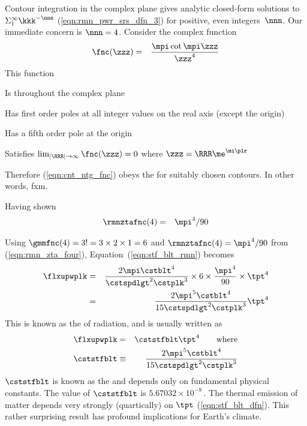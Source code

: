 \documentclass[12pt]{article}
\begin{document}
Contour integration in the complex plane gives analytic closed-form
solutions to $\Sigma_{1}^{\infty} \kkk^{-\nnn}$
(\ref{eqn:rmn_pwr_srs_dfn_3}) for positive, even integers~$\nnn$.
Our immediate concern is $\nnn = 4$.
Consider the complex function \cite[][p.~97]{CCP83}
\begin{eqnarray}
\fnc(\zzz) & = & \frac{\mpi\cot\mpi\zzz}{\zzz^{4}}
\label{eqn:cnt_ntg_fnc}
\end{eqnarray}
This function 
\begin{enumerate*}
\item Is  throughout the complex plane
\item Has first order poles at all integer values on the real axis
  (except the origin)
\item Has a fifth order pole at the origin
\item Satisfies $\lim_{|\RRR| \to \infty} \fnc(\zzz) = 0$
  where $\zzz = \RRR\me^{\mi\plr}$
\end{enumerate*}
Therefore (\ref{eqn:cnt_ntg_fnc}) obeys the 
for suitably chosen contours.
In other words, fxm.

Having shown 
\begin{eqnarray}
\rmnztafnc(4) & = & \mpi^{4}/90
\label{eqn:rmn_zta_four}
\end{eqnarray}

Using $\gmmfnc(4) = 3! = 3 \times 2 \times 1 = 6$
and $\rmnztafnc(4) = \mpi^{4}/90$ from (\ref{eqn:rmn_zta_four}),
Equation~(\ref{eqn:stf_blt_rmn}) becomes
\begin{eqnarray}
\flxupwplk 
& = & \frac{2 \mpi \cstblt^{4}}{\cstspdlgt^{2} \cstplk^{3}} 
\times 6 \times \frac{\mpi^{4}}{90} \times \tpt^{4}
\nonumber \\
& = & \frac{2 \mpi^{5} \cstblt^{4}}{15 \cstspdlgt^{2} \cstplk^{3}} \tpt^{4}
\nonumber
\label{eqn:stf_blt_3}
\end{eqnarray}
This is known as the  of radiation,
and is usually written as 
\begin{eqnarray}
\label{eqn:stf_blt_dfn}
\flxupwplk & = & \cststfblt \tpt^{4} \qquad \mbox{where} \\
\label{eqn:cst_stf_blt_dfn}
\cststfblt & \equiv & 
\frac{2 \mpi^{5} \cstblt^{4}}{15 \cstspdlgt^{2} \cstplk^{3}}
\end{eqnarray}
$\cststfblt$ is known as the 
and depends only on fundamental physical constants.
The value of $\cststfblt$ is $5.67032 \times 10^{-8}$\,\wxmSkQ.
The thermal emission of matter depends very strongly (quartically) on 
$\tpt$ (\ref{eqn:stf_blt_dfn}). 
This rather surprising result has profound implications for Earth's
climate. 
\end{document}
